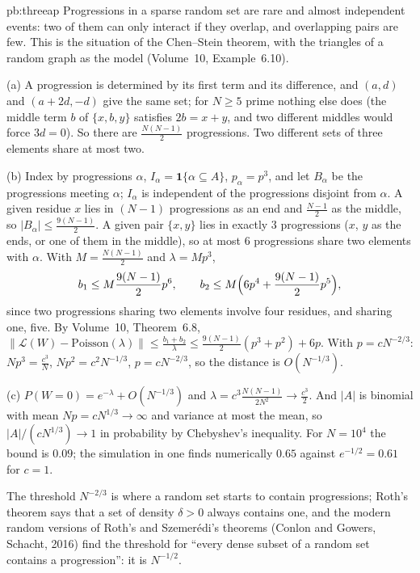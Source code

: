 \begin{solution}{pb:threeap}
\idea Progressions in a sparse random set are rare and almost independent events: two of them can only interact if they overlap, and overlapping pairs are few.
This is the situation of the Chen--Stein theorem, with the triangles of a random graph as the model (Volume~10, Example~6.10).

\writeup (a) A progression is determined by its first term and its difference, and $(a,d)$ and $(a+2d,-d)$ give the same set; for $N\ge5$ prime nothing else
does (the middle term $b$ of $\{x,b,y\}$ satisfies $2b=x+y$, and two different middles would force $3d=0$). So there are $\frac{N(N-1)}2$ progressions. Two different
sets of three elements share at most two.

(b) Index by progressions $\alpha$, $I_\alpha=\mathbf 1\{\alpha\subseteq A\}$, $p_\alpha=p^3$, and let $B_\alpha$ be the progressions meeting $\alpha$; $I_\alpha$ is independent of
the progressions disjoint from $\alpha$. A given residue $x$ lies in $(N-1)$ progressions as an end and $\frac{N-1}2$ as the middle, so $|B_\alpha|\le\frac{9(N-1)}2$. A given pair
$\{x,y\}$ lies in exactly $3$ progressions ($x$, $y$ as the ends, or one of them in the middle), so at most $6$ progressions share two elements with $\alpha$. With
$M=\frac{N(N-1)}2$ and $\lambda=Mp^3$,
\[
b_1\le M\frac{9(N-1)}2p^6,\qquad b_2\le M\Bigl(6p^4+\frac{9(N-1)}2p^5\Bigr),
\]
since two progressions sharing two elements involve four residues, and sharing one, five. By Volume~10, Theorem~6.8,
$\|\mathcal L(W)-\text{Poisson}(\lambda)\|\le\frac{b_1+b_2}\lambda\le\frac{9(N-1)}2(p^3+p^2)+6p$. With $p=cN^{-2/3}$: $Np^3=\frac{c^3}N$, $Np^2=c^2N^{-1/3}$, $p=cN^{-2/3}$, so the
distance is $O(N^{-1/3})$.

(c) $P(W=0)=e^{-\lambda}+O(N^{-1/3})$ and $\lambda=c^3\frac{N(N-1)}{2N^2}\to\frac{c^3}2$. And $|A|$ is binomial with mean $Np=cN^{1/3}\to\infty$ and variance at most the mean,
so $|A|/(cN^{1/3})\to1$ in probability by Chebyshev's inequality. For $N=10^4$ the bound is $0.09$; the simulation in one finds numerically $0.65$ against $e^{-1/2}=0.61$ for $c=1$.

\leads The threshold $N^{-2/3}$ is where a random set starts to contain progressions; Roth's theorem says that a set of density $\delta>0$ always contains one, and the
modern random versions of Roth's and Szemerédi's theorems (Conlon and Gowers, Schacht, 2016) find the threshold for ``every dense subset of a random set contains a
progression'': it is $N^{-1/2}$.
\end{solution}

